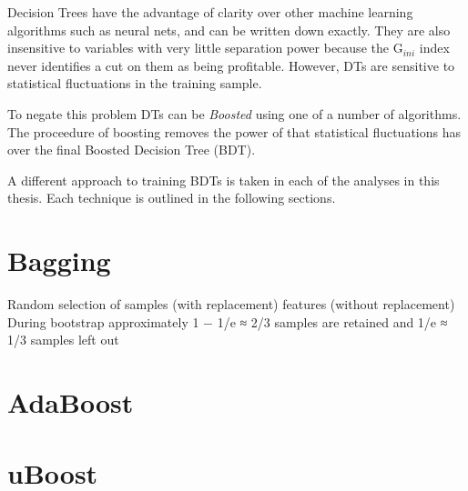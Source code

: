 Decision Trees have the advantage of clarity over other machine learning algorithms such as neural
nets, and can be written down exactly.
They are also insensitive to variables with very little separation power because the
$\mathrm{G}_{ini}$ index never identifies a cut on them as being profitable.
However, DTs are sensitive to statistical fluctuations in the training sample.

To negate this problem DTs can be \emph{Boosted} using one of a number of algorithms.
The proceedure of boosting removes the power of that statistical fluctuations has over the final
Boosted Decision Tree (BDT).

A different approach to training BDTs is taken in each of the analyses in this thesis.
Each technique is outlined in the following sections.


\section{Bagging}
Random selection of
samples (with replacement) features (without replacement)
During bootstrap approximately 1 − 1/e ≈ 2/3 samples are retained and 1/e ≈ 1/3 samples left out





\section{AdaBoost}





\section{uBoost}







%









